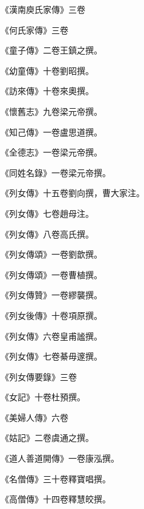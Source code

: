 \begin{pinyinscope}
 《漢南庾氏家傳》三卷



 《何氏家傳》三卷



 《童子傳》二卷王鎮之撰。



 《幼童傳》十卷劉昭撰。



 《訪來傳》十卷來奧撰。



 《懷舊志》九卷梁元帝撰。



 《知己傳》一卷盧思道撰。



 《全德志》一卷梁元帝撰。



 《同姓名錄》一卷梁元帝撰。



 《列女傳》十五卷劉向撰，曹大家注。



 《列女傳》七卷趙母注。



 《列女傳》八卷高氏撰。



 《列女傳頌》一卷劉歆撰。



 《列女傳頌》一卷曹植撰。



 《列女傳贊》一卷繆襲撰。



 《列女後傳》十卷項原撰。



 《列女傳》六卷皇甫謐撰。



 《列女傳》七卷綦毋邃撰。



 《列女傳要錄》三卷



 《女記》十卷杜預撰。



 《美婦人傳》六卷



 《姑記》二卷虞通之撰。



 《道人善道開傳》一卷康泓撰。



 《名僧傳》三十卷釋寶唱撰。



 《高僧傳》十四卷釋慧皎撰。




\end{pinyinscope}
